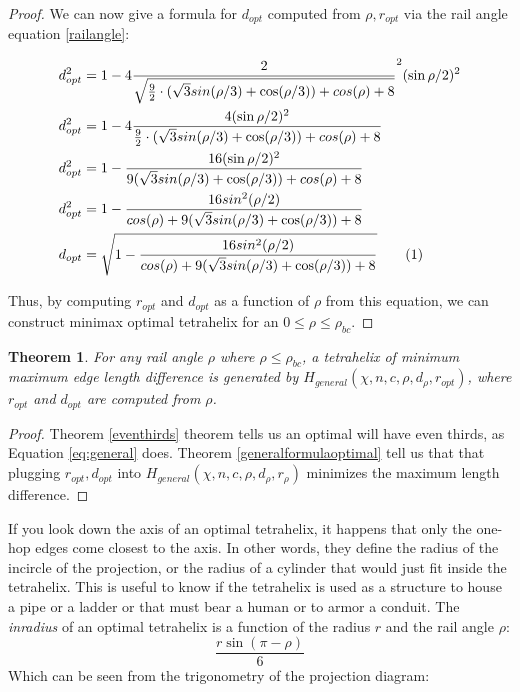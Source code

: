 \documentclass[11pt]{article}
\newtheorem{theorem}{Theorem}
\newcommand\numberthis{\addtocounter{equation}{1}\tag{\theequation}}
\begin{document}
\begin{proof}
We can now give a formula for $ d_{opt} $ computed from $\rho, r_{opt}$ via the rail angle equation \eqref{railangle}:

\begin{align*}
  d_{opt}^2 &= 1 - 4 \frac{2}{\sqrt{\frac{9}{2} \cdot ( \sqrt{3} sin(\rho/3) + \cos(\rho/3)) + cos(\rho)+ 8 }}^2 (\sin{ \rho / 2})^2   \\
  d_{opt}^2 &= 1 - 4 \frac{4(\sin{ \rho / 2})^2}{\frac{9}{2} \cdot ( \sqrt{3} sin(\rho/3) + \cos(\rho/3)) + cos(\rho)+ 8 }    \\
  d_{opt}^2 &= 1 - \frac{16(\sin{ \rho / 2})^2}{9 ( \sqrt{3} sin(\rho/3) + \cos(\rho/3)) + cos(\rho)+ 8 }    \\
  d_{opt}^2 &= 1 - \frac{16 sin^2(\rho / 2) }{ cos(\rho) + 9( \sqrt{3} sin(\rho/3) + \cos(\rho/3)) + 8 }   \\
    d_{opt} &= \sqrt{1 - \frac{16 sin^2(\rho / 2) }{ cos(\rho) + 9( \sqrt{3} sin(\rho/3) + \cos(\rho/3)) + 8 }}    \numberthis  \label{dopt}  \\      
\end{align*}

Thus, by computing $r_{opt}$  and $d_{opt}$ as a function of $\rho$ from this equation, we can construct minimax optimal tetrahelix for an $0 \leq \rho \leq \rho_{bc}$.
\end{proof}



\begin{theorem}
  \label{optimality}
  For any rail angle $\rho$ where $\rho \leq \rho_{bc}$, a tetrahelix of minimum maximum edge length
  difference is generated by $H_{general}(\chi,n,c,\rho,d_{\rho},r_{opt})$, where $r_{opt}$ and $d_{opt}$ are
  computed from $\rho$. 
\end{theorem}

\begin{proof}
  Theorem \ref{eventhirds} theorem tells us an optimal will have even thirds,
  as Equation \eqref{eq:general} does.
  Theorem \ref{generalformulaoptimal} tell us that
  that plugging $r_{opt}, d_{opt}$ into $H_{general}(\chi,n,c,\rho,d_{\rho},r_{\rho})$ minimizes the maximum length difference.
\end{proof}

If you look down the axis of an optimal tetrahelix, it happens that only the one-hop edges
come closest to the axis. In other words, they define the radius of the incircle of the
projection, or the radius of a cylinder that would just fit inside the tetrahelix.
This is useful to know if the tetrahelix is used as a structure to house a pipe or
a ladder or that must bear a human or to armor a conduit. The \emph{inradius} of
an optimal tetrahelix is a function of the radius $r$ and the rail angle $\rho$:
\begin{equation}
  \label{eq:inradius}
  \frac{r \sin{(\pi - \rho)}}{6}
\end{equation}
Which can be seen from the trigonometry of the projection diagram:
\end{document}
